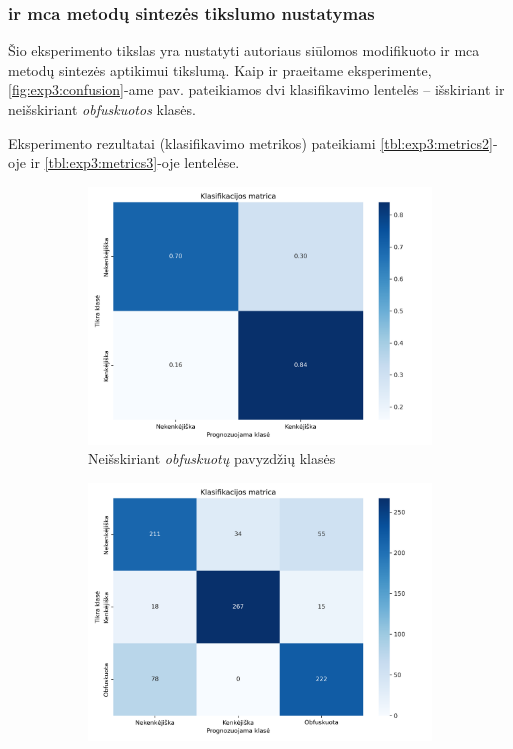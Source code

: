 \subsubsection{\LIME ir \gls{mca} metodų sintezės tikslumo nustatymas}\label{sec:exp:3}

Šio eksperimento tikslas yra nustatyti autoriaus siūlomos modifikuoto \LIME ir \gls{mca} metodų sintezės  aptikimui tikslumą. Kaip ir praeitame eksperimente, \ref{fig:exp3:confusion}-ame pav. pateikiamos dvi klasifikavimo lentelės -- išskiriant ir neišskiriant \textit{obfuskuotos} klasės. 

Eksperimento rezultatai (klasifikavimo metrikos) pateikiami \ref{tbl:exp3:metrics2}-oje ir \ref{tbl:exp3:metrics3}-oje lentelėse.

\begin{figure}[h]
    \begin{subfigure}{0.5\textwidth}
        \centering
        \includegraphics[width=\textwidth]{images/synthesis_2x2.png}
        \caption{Neišskiriant \textit{obfuskuotų} pavyzdžių klasės}
    \end{subfigure}
    \begin{subfigure}{0.5\textwidth}
        \centering
        \includegraphics[width=\textwidth]{images/synthesis_3x3.png}

\end{subfigure}
\end{figure}
